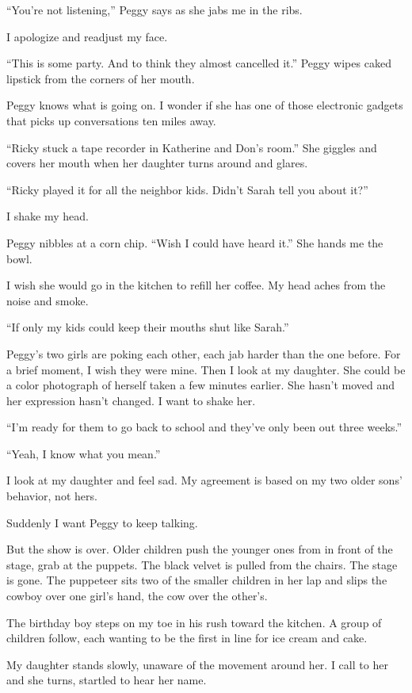 \documentclass[twoside,10pt]{book}
\begin{document}
``You're not listening,'' Peggy says as she jabs me in the ribs.

I apologize and readjust my face.

``This is some party. And to think they almost cancelled it.'' Peggy
wipes caked lipstick from the corners of her mouth.

Peggy knows what is going on. I wonder if she has one of those
electronic gadgets that picks up conversations ten miles away.

``Ricky stuck a tape recorder in Katherine and Don's room.'' She giggles
and covers her mouth when her daughter turns around and glares.

``Ricky played it for all the neighbor kids. Didn't Sarah tell you about
it?''

I shake my head.

Peggy nibbles at a corn chip. ``Wish I could have heard it.'' She hands
me the bowl.

I wish she would go in the kitchen to refill her coffee. My head aches
from the noise and smoke.

``If only my kids could keep their mouths shut like Sarah.''

Peggy's two girls are poking each other, each jab harder than the one
before. For a brief moment, I wish they were mine. Then I look at my
daughter. She could be a color photograph of herself taken a few minutes
earlier. She hasn't moved and her expression hasn't changed. I want to
shake her.

``I'm ready for them to go back to school and they've only been out
three weeks.''

``Yeah, I know what you mean.''

I look at my daughter and feel sad. My agreement is based on my two
older sons' behavior, not hers.

Suddenly I want Peggy to keep talking.

But the show is over. Older children push the younger ones from in front
of the stage, grab at the puppets. The black velvet is pulled from the
chairs. The stage is gone. The puppeteer sits two of the smaller
children in her lap and slips the cowboy over one girl's hand, the cow
over the other's.

The birthday boy steps on my toe in his rush toward the kitchen. A group
of children follow, each wanting to be the first in line for ice cream
and cake.

My daughter stands slowly, unaware of the movement around her. I call to
her and she turns, startled to hear her name.
\end{document}
